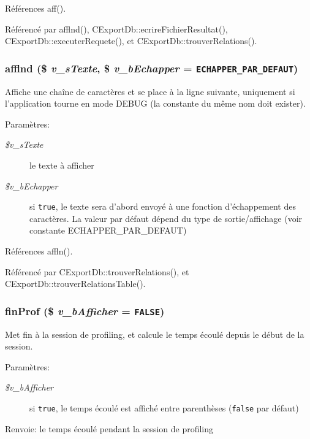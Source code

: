 Références aff().

Référencé par afflnd(), CExportDb::ecrireFichierResultat(), CExportDb::executerRequete(), et CExportDb::trouverRelations().
\subsubsection{\setlength{\rightskip}{0pt plus 5cm}afflnd (\$ {\em v\_\-sTexte}, \/  \$ {\em v\_\-bEchapper} = {\tt ECHAPPER\_\-PAR\_\-DEFAUT})}\label{export_8php_253741e7ce84a279331b97368b79a0eb}


Affiche une chaîne de caractères et se place à la ligne suivante, uniquement si l'application tourne en mode DEBUG (la constante du même nom doit exister). 

\begin{Desc}
\item[Paramètres:]
\begin{description}
\item[{\em \$v\_\-sTexte}]le texte à afficher \item[{\em \$v\_\-bEchapper}]si {\tt true}, le texte sera d'abord envoyé à une fonction d'échappement des caractères. La valeur par défaut dépend du type de sortie/affichage (voir constante ECHAPPER\_\-PAR\_\-DEFAUT) \end{description}
\end{Desc}


Références affln().

Référencé par CExportDb::trouverRelations(), et CExportDb::trouverRelationsTable().
\subsubsection{\setlength{\rightskip}{0pt plus 5cm}finProf (\$ {\em v\_\-bAfficher} = {\tt FALSE})}\label{export_8php_7978569f849ce15a2a4f5dcd0061cb49}


Met fin à la session de profiling, et calcule le temps écoulé depuis le début de la session. 

\begin{Desc}
\item[Paramètres:]
\begin{description}
\item[{\em \$v\_\-bAfficher}]si {\tt true}, le temps écoulé est affiché entre parenthèses ({\tt false} par défaut)\end{description}
\end{Desc}
\begin{Desc}
\item[Renvoie:]le temps écoulé pendant la session de profiling \end{Desc}


